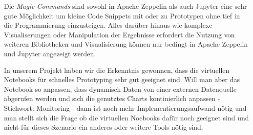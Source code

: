 Die \textit{Magic-Commands} sind sowohl in Apache Zeppelin als auch Jupyter eine sehr gute Möglichkeit um kleine Code Snippets mit  oder  zu Prototypen ohne tief in die Programmierung einzusteigen.
Alles darüber hinaus wie komplexe Visualiserungen oder Manipulation der Ergebnisse erfordert die Nutzung von weiteren Bibliotheken und
Visualisierung können nur bedingt in Apache Zeppelin und Jupyter angezeigt werden.

In unserem Projekt haben wir die Erkenntnis gewonnen, dass die virtuellen Notebooks für schnelles Prototyping sehr gut geeignet sind.
Will man aber das Notebook so anpassen, dass \zb{} dynamisch Daten von einer externen Datenquelle abgerufen werden
und sich die genutztes Charts kontinierlich anpassen - Stichwort: Monitoring - dann ist noch mehr Implementierungsaufwand nötig und man stellt sich die
Frage ob die virtuellen Noebooks dafür noch geeignet sind und nicht für dieses Szenario ein anderes oder weitere Tools nötig sind.

